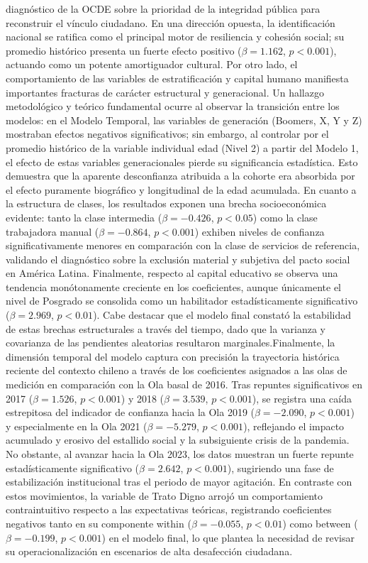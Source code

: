 \documentclass[
  spanish,
  a4paper,
  oneside]{scrbook}
\begin{document}
diagnóstico de la OCDE sobre la prioridad de la integridad pública para
reconstruir el vínculo ciudadano. En una dirección opuesta, la
identificación nacional se ratifica como el principal motor de
resiliencia y cohesión social; su promedio histórico presenta un fuerte
efecto positivo (\(\beta = 1.162\), \(p < 0.001\)), actuando como un
potente amortiguador cultural. Por otro lado, el comportamiento de las
variables de estratificación y capital humano manifiesta importantes
fracturas de carácter estructural y generacional. Un hallazgo
metodológico y teórico fundamental ocurre al observar la transición
entre los modelos: en el Modelo Temporal, las variables de generación
(Boomers, X, Y y Z) mostraban efectos negativos significativos; sin
embargo, al controlar por el promedio histórico de la variable
individual edad (Nivel 2) a partir del Modelo 1, el efecto de estas
variables generacionales pierde su significancia estadística. Esto
demuestra que la aparente desconfianza atribuida a la cohorte era
absorbida por el efecto puramente biográfico y longitudinal de la edad
acumulada. En cuanto a la estructura de clases, los resultados exponen
una brecha socioeconómica evidente: tanto la clase intermedia
(\(\beta = -0.426\), \(p < 0.05\)) como la clase trabajadora manual
(\(\beta = -0.864\), \(p < 0.001\)) exhiben niveles de confianza
significativamente menores en comparación con la clase de servicios de
referencia, validando el diagnóstico sobre la exclusión material y
subjetiva del pacto social en América Latina. Finalmente, respecto al
capital educativo se observa una tendencia monótonamente creciente en
los coeficientes, aunque únicamente el nivel de Posgrado se consolida
como un habilitador estadísticamente significativo (\(\beta = 2.969\),
\(p < 0.01\)). Cabe destacar que el modelo final constató la estabilidad
de estas brechas estructurales a través del tiempo, dado que la varianza
y covarianza de las pendientes aleatorias resultaron
marginales.Finalmente, la dimensión temporal del modelo captura con
precisión la trayectoria histórica reciente del contexto chileno a
través de los coeficientes asignados a las olas de medición en
comparación con la Ola basal de 2016. Tras repuntes significativos en
2017 (\(\beta = 1.526\), \(p < 0.001\)) y 2018 (\(\beta = 3.539\),
\(p < 0.001\)), se registra una caída estrepitosa del indicador de
confianza hacia la Ola 2019 (\(\beta = -2.090\), \(p < 0.001\)) y
especialmente en la Ola 2021 (\(\beta = -5.279\), \(p < 0.001\)),
reflejando el impacto acumulado y erosivo del estallido social y la
subsiguiente crisis de la pandemia. No obstante, al avanzar hacia la Ola
2023, los datos muestran un fuerte repunte estadísticamente
significativo (\(\beta = 2.642\), \(p < 0.001\)), sugiriendo una fase de
estabilización institucional tras el periodo de mayor agitación. En
contraste con estos movimientos, la variable de Trato Digno arrojó un
comportamiento contraintuitivo respecto a las expectativas teóricas,
registrando coeficientes negativos tanto en su componente within
(\(\beta = -0.055\), \(p < 0.01\)) como between (\(\beta = -0.199\),
\(p < 0.001\)) en el modelo final, lo que plantea la necesidad de
revisar su operacionalización en escenarios de alta desafección
ciudadana.
\end{document}

